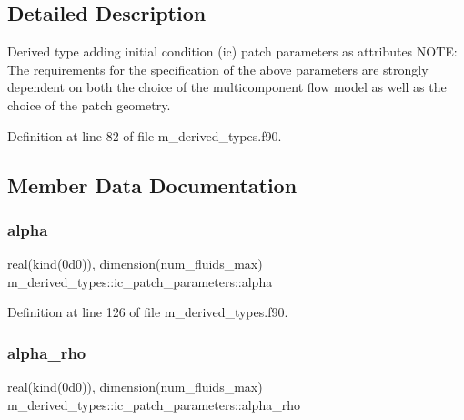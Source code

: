 \subsection{Detailed Description}
Derived type adding initial condition (ic) patch parameters as attributes N\+O\+TE\+: The requirements for the specification of the above parameters are strongly dependent on both the choice of the multicomponent flow model as well as the choice of the patch geometry. 

Definition at line 82 of file m\+\_\+derived\+\_\+types.\+f90.



\subsection{Member Data Documentation}
\mbox{\label{structm__derived__types_1_1ic__patch__parameters_ab4d5d9af0cad8578dd224f486891dd4d}} 
\subsubsection{\texorpdfstring{alpha}{alpha}}
{\footnotesize\ttfamily real(kind(0d0)), dimension(num\+\_\+fluids\+\_\+max) m\+\_\+derived\+\_\+types\+::ic\+\_\+patch\+\_\+parameters\+::alpha}



Definition at line 126 of file m\+\_\+derived\+\_\+types.\+f90.

\mbox{\label{structm__derived__types_1_1ic__patch__parameters_a528b19d32d95f0979ea3c55e369c92d1}} 
\subsubsection{\texorpdfstring{alpha\+\_\+rho}{alpha\_rho}}
{\footnotesize\ttfamily real(kind(0d0)), dimension(num\+\_\+fluids\+\_\+max) m\+\_\+derived\+\_\+types\+::ic\+\_\+patch\+\_\+parameters\+::alpha\+\_\+rho}



